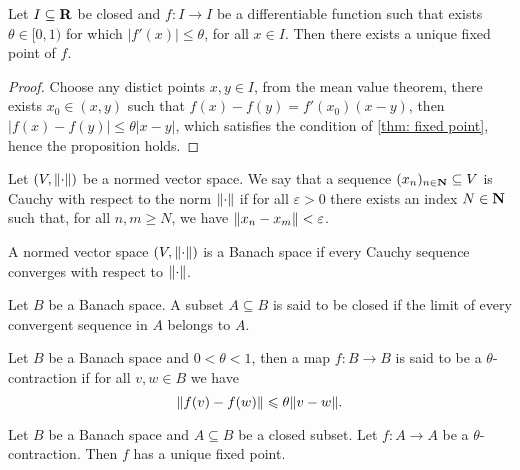 \begin{corollary}
Let \(I \subseteq \mathbf{R}\) be closed and \(f : I \to I\) be a
differentiable function such that exists \(\theta \in [0, 1)\) for which
\(|f'(x)| \leq \theta\), for all \(x \in I\). Then there exists a unique fixed
point of \(f\).
\end{corollary}

\begin{proof}
Choose any distict points \(x, y \in I\), from the mean value theorem, there
exists \(x_0 \in (x, y)\) such that \(f(x) - f(y) = f'(x_0)(x - y)\), then
\(|f(x) - f(y)| \leq \theta |x - y|\), which satisfies the condition of
\cref{thm: fixed point}, hence the proposition holds.
\end{proof}

\begin{definition}
Let \((V, \lVert\cdot\rVert)\) be a normed vector space. We say that a sequence
\((x_n)_{n \in \mathbf{N}} \subseteq V\) is Cauchy with respect to the norm \(\lVert\cdot\rVert\) if for all
\(\varepsilon > 0\) there exists an index \(N \in \mathbf{N}\) such that, for all \(n, m \geq N\), we
have \(\lVert x_n - x_m\rVert < \varepsilon\).
\end{definition}


\begin{definition}\label{def: Banach space}
A normed vector space \((V, \lVert\cdot\rVert)\) is a Banach space if every Cauchy
sequence converges with respect to \(\lVert\cdot\rVert\).
\end{definition}

\begin{definition}
Let \(B\) be a Banach space. A subset \(A \subseteq B\) is said to be closed
if the limit of every convergent sequence in \(A\) belongs to \(A\).
\end{definition}

\begin{definition}[Contraction]
\label{def:contraction}
Let \(B\) be a Banach space and \(0 < \theta < 1\), then a map \(f: B \to B\)
is said to be a \(\theta\)-contraction if for all \(v, w \in B\) we have
\[
\lVert f(v) - f(w)\rVert \leqslant \theta \lVert v - w\rVert.
\]
\end{definition}

\begin{theorem}\label{thm: Banach fixed point}
Let \(B\) be a Banach space and \(A \subseteq B\) be a closed subset. Let \(f:
A \to A\) be a \(\theta\)-contraction. Then \(f\) has a unique fixed point.
\end{theorem}

